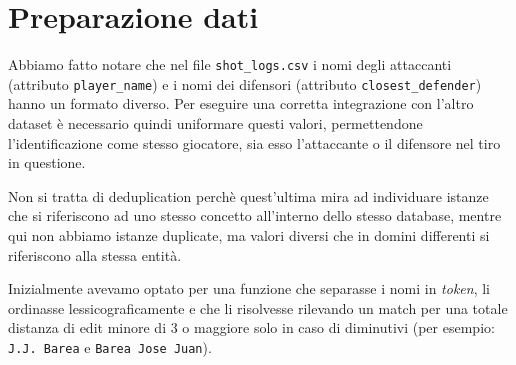 \chapter{Preparazione dati}

Abbiamo fatto notare che nel file \texttt{shot\_logs.csv} i nomi degli attaccanti (attributo \texttt{player\_name}) e i nomi dei difensori (attributo \texttt{closest\_defender}) hanno un formato diverso. Per eseguire una corretta integrazione con l’altro dataset è necessario quindi uniformare questi valori, permettendone l’identificazione come stesso giocatore, sia esso l’attaccante o il difensore nel tiro in questione. 
\par
Non si tratta di deduplication perchè quest’ultima mira ad individuare istanze che si riferiscono ad uno stesso concetto all’interno dello stesso database, mentre qui non abbiamo istanze duplicate, ma valori diversi che in domini differenti si riferiscono alla stessa entità.
\par
Inizialmente avevamo optato per una funzione che separasse i nomi in \textit{token}, li ordinasse lessicograficamente e che li risolvesse rilevando un match per una totale distanza di edit minore di 3 o maggiore solo in caso di diminutivi (per esempio: \texttt{J.J. Barea} e \texttt{Barea Jose Juan}).

